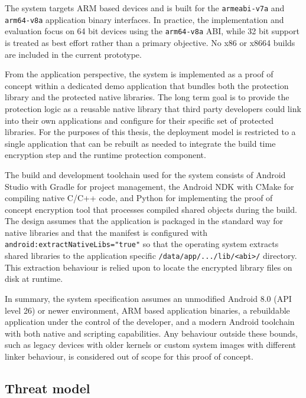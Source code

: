 \documentclass[11pt,a4paper]{report}
\renewcommand\_{{\textunderscore\allowbreak}}
\begin{document}
The system targets ARM based devices and is built for the \texttt{armeabi-v7a} and \texttt{arm64-v8a} application binary interfaces. In practice, the implementation and evaluation focus on 64 bit devices using the \texttt{arm64-v8a} ABI, while 32 bit support is treated as best effort rather than a primary objective. No x86 or x86\_64 builds are included in the current prototype.

From the application perspective, the system is implemented as a proof of concept within a dedicated demo application that bundles both the protection library and the protected native libraries. The long term goal is to provide the protection logic as a reusable native library that third party developers could link into their own applications and configure for their specific set of protected libraries. For the purposes of this thesis, the deployment model is restricted to a single application that can be rebuilt as needed to integrate the build time encryption step and the runtime protection component.

The build and development toolchain used for the system consists of Android Studio with Gradle for project management, the Android NDK with CMake for compiling native C/C++ code, and Python for implementing the proof of concept encryption tool that processes compiled shared objects during the build. The design assumes that the application is packaged in the standard way for native libraries and that the manifest is configured with \texttt{android:extractNativeLibs="true"} so that the operating system extracts shared libraries to the application specific \texttt{/data/app/.../lib/<abi>/} directory. This extraction behaviour is relied upon to locate the encrypted library files on disk at runtime.

In summary, the system specification assumes an unmodified Android 8.0 (API level 26) or newer environment, ARM based application binaries, a rebuildable application under the control of the developer, and a modern Android toolchain with both native and scripting capabilities. Any behaviour outside these bounds, such as legacy devices with older kernels or custom system images with different linker behaviour, is considered out of scope for this proof of concept.

\subsection{Threat model}
\end{document}
